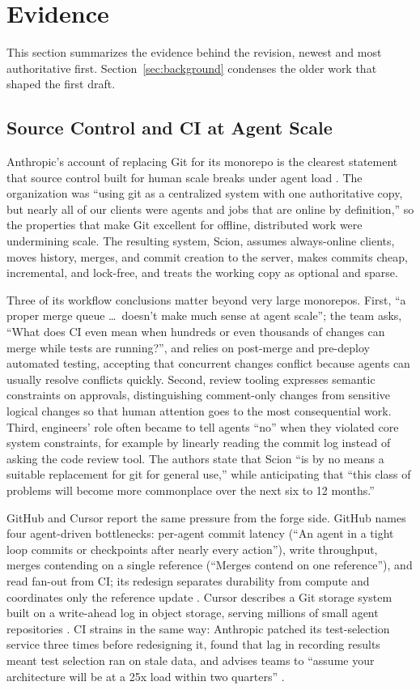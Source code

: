 \documentclass[11pt]{article}
\begin{document}
\section{Evidence}
This section summarizes the evidence behind the revision, newest and most authoritative first. Section~\ref{sec:background} condenses the older work that shaped the first draft.

\subsection{Source Control and CI at Agent Scale}
Anthropic's account of replacing Git for its monorepo is the clearest statement that source control built for human scale breaks under agent load \cite{anthropic2026scion}. The organization was ``using git as a centralized system with one authoritative copy, but nearly all of our clients were agents and jobs that are online by definition,'' so the properties that make Git excellent for offline, distributed work were undermining scale. The resulting system, Scion, assumes always-online clients, moves history, merges, and commit creation to the server, makes commits cheap, incremental, and lock-free, and treats the working copy as optional and sparse.

Three of its workflow conclusions matter beyond very large monorepos. First, ``a proper merge queue \ldots\ doesn't make much sense at agent scale''; the team asks, ``What does CI even mean when hundreds or even thousands of changes can merge while tests are running?'', and relies on post-merge and pre-deploy automated testing, accepting that concurrent changes conflict because agents can usually resolve conflicts quickly. Second, review tooling expresses semantic constraints on approvals, distinguishing comment-only changes from sensitive logical changes so that human attention goes to the most consequential work. Third, engineers' role often became to tell agents ``no'' when they violated core system constraints, for example by linearly reading the commit log instead of asking the code review tool. The authors state that Scion ``is by no means a suitable replacement for git for general use,'' while anticipating that ``this class of problems will become more commonplace over the next six to 12 months.''

GitHub and Cursor report the same pressure from the forge side. GitHub names four agent-driven bottlenecks: per-agent commit latency (``An agent in a tight loop commits or checkpoints after nearly every action''), write throughput, merges contending on a single reference (``Merges contend on one reference''), and read fan-out from CI; its redesign separates durability from compute and coordinates only the reference update \cite{celenza2026gitinfra}. Cursor describes a Git storage system built on a write-ahead log in object storage, serving millions of small agent repositories \cite{marti2026gitscale}. CI strains in the same way: Anthropic patched its test-selection service three times before redesigning it, found that lag in recording results meant test selection ran on stale data, and advises teams to ``assume your architecture will be at a 25x load within two quarters'' \cite{malhotra2026ci}.
\end{document}
